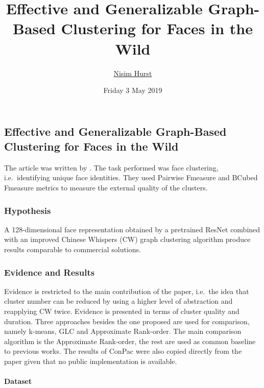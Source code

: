 \documentclass[]{article}
\title{Effective and Generalizable Graph-Based Clustering for Faces in the Wild}
\author{\href{mailto:langheran@gmail.com}{Nisim Hurst}}
\date{Friday 3 May 2019}
\let\oldparagraph\paragraph
\renewcommand{\paragraph}[1]{\oldparagraph{#1}\mbox{}}
\begin{document}
\maketitle

\label{toc}

\hypertarget{effective-and-generalizable-graph-based-clustering-for-faces-in-the-wild}{%
\subsection{Effective and Generalizable Graph-Based Clustering for Faces in the Wild}\label{effective-and-generalizable-graph-based-clustering-for-faces-in-the-wild}}

The article was written by \autocite{leonardochang2018}. The task performed was face clustering, i.e.~identifying unique face identities. They used Pairwise Fmeasure and BCubed Fmeasure metrics to measure the external quality of the clusters.

\hypertarget{hypothesis}{%
\subsubsection{Hypothesis}\label{hypothesis}}

A 128-dimensional face representation obtained by a pretrained ResNet combined with an improved Chinese Whispers (CW) graph clustering algorithm produce results comparable to commercial solutions.

\hypertarget{evidence-and-results}{%
\subsubsection{Evidence and Results}\label{evidence-and-results}}

Evidence is restricted to the main contribution of the paper, i.e.~the idea that cluster number can be reduced by using a higher level of abstraction and reapplying CW twice. Evidence is presented in terms of cluster quality and duration. Three approaches besides the one proposed are used for comparison, namely k-means, GLC and Approximate Rank-order. The main comparison algorithm is the Approximate Rank-order, the rest are used as common baseline to previous works. The results of ConPac were also copied directly from the paper given that no public implementation is available.

\hypertarget{dataset}{%
\paragraph{Dataset}\label{dataset}}
\end{document}

